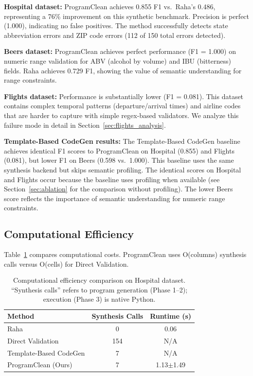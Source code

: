 \documentclass{article}
\begin{document}
\textbf{Hospital dataset:} ProgramClean achieves 0.855 F1 vs.~Raha's 0.486, representing a 76\% improvement on this synthetic benchmark. Precision is perfect (1.000), indicating no false positives. The method successfully detects state abbreviation errors and ZIP code errors (112 of 150 total errors detected).

\textbf{Beers dataset:} ProgramClean achieves perfect performance (F1 = 1.000) on numeric range validation for ABV (alcohol by volume) and IBU (bitterness) fields. Raha achieves 0.729 F1, showing the value of semantic understanding for range constraints.

\textbf{Flights dataset:} Performance is substantially lower (F1 = 0.081). This dataset contains complex temporal patterns (departure/arrival times) and airline codes that are harder to capture with simple regex-based validators. We analyze this failure mode in detail in Section~\ref{sec:flights_analysis}.

\textbf{Template-Based CodeGen results:} The Template-Based CodeGen baseline achieves identical F1 scores to ProgramClean on Hospital (0.855) and Flights (0.081), but lower F1 on Beers (0.598 vs.~1.000). This baseline uses the same synthesis backend but skips semantic profiling. The identical scores on Hospital and Flights occur because the baseline uses profiling when available (see Section~\ref{sec:ablation} for the comparison without profiling). The lower Beers score reflects the importance of semantic understanding for numeric range constraints.

\subsection{Computational Efficiency}

Table~\ref{tab:efficiency} compares computational costs. ProgramClean uses O(columns) synthesis calls versus O(cells) for Direct Validation.

\begin{table}[h]
\caption{Computational efficiency comparison on Hospital dataset. ``Synthesis calls'' refers to program generation (Phase 1--2); execution (Phase 3) is native Python.}
\label{tab:efficiency}
\centering
\small
\begin{tabular}{lcc}
\toprule
Method & Synthesis Calls & Runtime (s) \\
\midrule
Raha & 0 & 0.06 \\
Direct Validation & 154 & N/A \\
Template-Based CodeGen & 7 & N/A \\
ProgramClean (Ours) & 7 & 1.13$\pm$1.49 \\
\bottomrule
\end{tabular}
\end{table}
\end{document}
